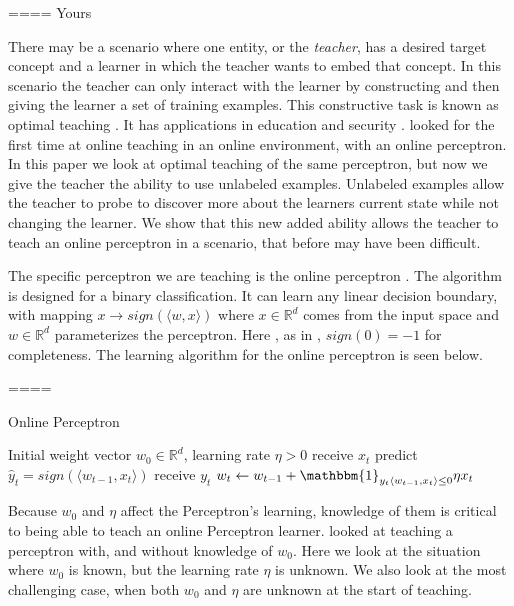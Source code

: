\documentclass{article}
\begin{document}
====
Yours

There may be a scenario where one entity, or the \textit{teacher},  has a desired target concept and a learner in which the teacher wants to embed that concept. In this scenario the teacher can only interact with the learner by constructing and then giving the learner a set of training examples. This constructive task is known as optimal teaching \cite{machine_teaching} \cite{teaching_dimension}. It has applications in education and security \cite{security}\cite{education} \cite{poisoning}. \cite{perceptron}\cite{td_linear} looked for the first time at online teaching in an online environment, with an online perceptron. In this paper we look at optimal teaching of the same perceptron, but now we give the teacher the ability to use unlabeled examples. Unlabeled examples allow the teacher to probe to discover more about the learners current state while not changing the learner. We show that this new added ability allows the teacher to teach an online perceptron in a scenario, that before may have been difficult.

The specific perceptron we are teaching is the  online perceptron \cite{perceptron_algo}. The algorithm is designed for a binary classification. It can learn any linear decision boundary,
with mapping $x \to sign(\langle w, x \rangle)$ where $x \in \mathbb{R}^d$ comes from the input space and $w \in \mathbb{R}^d$ parameterizes the perceptron. Here , as in \cite{perceptron}, $sign(0) = -1$ for completeness. The learning algorithm for the online perceptron is seen below.

====

\begin{algorithm}
\caption{Online Perceptron}
\begin{algorithmic}[1]
	\REQUIRE Initial weight vector $w_0 \in \mathbb{R}^d$, learning rate $\eta > 0$
    	\STATE receive $x_t$
    	\STATE predict $\hat{y}_t = sign(\langle w_{t-1} , x_t \rangle)$
    	\STATE receive $y_t$
    	\STATE $w_t \leftarrow w_{t-1} + \mathbbm{1}_{y_t \langle w_{t-1} , x_t \rangle \leq 0} \eta x_t$
    \ENDFOR
\end{algorithmic}
\end{algorithm}

Because $w_0$ and $\eta$ affect the Perceptron's learning, knowledge of them is
critical to being able to teach an online Perceptron learner. \cite{perceptron}
looked at teaching a perceptron with, and without knowledge of $w_0$. Here we
look at the situation where $w_0$ is known, but the learning rate $\eta$ is
unknown. We also look at the most challenging case, when both $w_0$ and $\eta$
are unknown at the start of teaching. 
\end{document}
